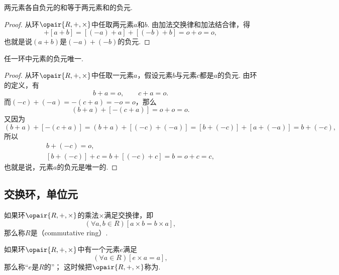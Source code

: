 \begin{property}
两元素各自负元的和等于两元素和的负元.
\begin{proof}
从环\(\opair{R,+,\times}\)中任取两元素\(a\)和\(b\).
由加法交换律和加法结合律，得\begin{equation*}
	[(-a) + (-b)] + [a + b]
	= [(-a) + a] + [(-b) + b]
	= o + o = o,
\end{equation*}
也就是说\((a+b)\)是\((-a) + (-b)\)的负元.
\end{proof}
\end{property}

\begin{property}
任一环中元素的负元唯一.
\begin{proof}
从环\(\opair{R,+,\times}\)中任取一元素\(a\)，假设元素\(b\)与元素\(c\)都是\(a\)的负元.
由环的定义，有\begin{equation*}
	b + a = o, \qquad
	c + a = o.
\end{equation*}
而\((-c) + (-a) = -(c + a) = -o = o\)，那么\begin{equation*}
	(b + a) + [-(c + a)]
	= o + o = o.
\end{equation*}又因为\begin{equation*}
	(b + a) + [-(c + a)]
	= (b + a) + [(-c) + (-a)]
	= [b + (-c)] + [a + (-a)]
	= b + (-c),
\end{equation*}所以\begin{gather*}
	b + (-c) = o, \\
	[b + (-c)] + c = b + [(-c) + c] = b = o + c = c,
\end{gather*}
也就是说，元素\(a\)的负元是唯一的.
\end{proof}
\end{property}

\subsection{交换环，单位元}
\begin{definition}
如果环\(\opair{R,+,\times}\)的乘法\(\times\)满足交换律，即\begin{equation*}
	(\forall a,b \in R)[a \times b = b \times a],
\end{equation*}
那么称\(R\)是（commutative ring）.
\end{definition}

\begin{definition}
如果环\(\opair{R,+,\times}\)中有一个元素\(e\)满足\begin{equation*}
	(\forall a \in R)[e \times a = a],
\end{equation*}
那么称“\(e\)是\(R\)的”；
这时候把\(\opair{R,+,\times}\)称为.
\end{definition}

